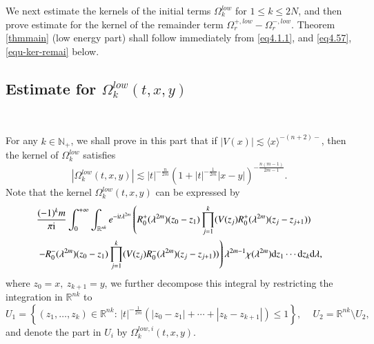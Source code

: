 \documentclass[11pt,reqno]{amsart}
\def\R {\mathbb{R}}
\def\d{{\rm d}}
\def\i{{\rm i}}
\def\k{{ \textbf{k}}}
\numberwithin{equation}{section}
\theoremstyle{definition}
\begin{document}

We next estimate the kernels of the initial terms $\Omega^{low}_{k}$ for $1\le k\le 2N$, and then prove estimate for the kernel of the remainder term $\Omega^{+, low}_{ r}-\Omega^{-, low}_{r}$. Theorem \ref{thmmain} (low energy part) shall follow immediately from \eqref{eq4.1.1}, and \eqref{eq4.57}, \eqref{equ-ker-remai} below.




\subsection{Estimate for $\Omega^{low}_{k}(t,x,y)$}\label{sec4.2.3}\

%
For any $k\in \mathbb{N}_+$, we shall prove in this part that if  $|V(x)|\lesssim\langle x\rangle^{-(n+2)-}$, then the kernel of $\Omega^{low}_{k}$ satisfies
\begin{equation}\label{eq4.57}
	\left|\Omega^{low}_{k}(t,x,y)\right| \lesssim |t|^{-\frac{n}{2m}}\left(1+|t|^{-\frac{1}{2m}}|x-y|\right)^{-\frac{n(m-1)}{2m-1}}.
\end{equation}
Note that the kernel $\Omega^{low}_{k}(t,x,y)$ can be expressed by
 \begin{align*}\label{eq4.58}
 	&\frac{(-1)^{k}m}{\pi \i}\int_{0}^{+\infty}\int_{\R^{nk}}e^{-\i t\lambda^{2m}}\left(R_{0}^{+}(\lambda^{2m})(z_{0}-z_{1})\prod_{j=1}^{k}(V(z_{j})R_{0}^{+}(\lambda^{2m})(z_{j}-z_{j+1}))\right.\nonumber\\	&\left.-R_{0}^{-}(\lambda^{2m})(z_{0}-z_{1})\prod_{j=1}^{k}(V(z_{j})R_{0}^{-}(\lambda^{2m})(z_{j}-z_{j+1}))\right)\lambda^{2m-1}\chi(\lambda^{2m})\d z_{1}\cdots \d z_{k}\d\lambda,
 \end{align*}
 where $z_{0}=x,\ z_{k+1}=y$, we further decompose this integral by restricting the integration in $\mathbb{R}^{nk}$ to
$$
U_1=\left\{(z_1,\ldots, z_k)\in \R^{nk}: \,|t|^{-\frac{1}{2m}}(|z_{0}-z_{1}|+\cdots+|z_{k}-z_{k+1}|)\leq1\right\},\,\quad U_2=\R^{nk}\setminus  U_2,
$$
and denote the part in $U_i$ by $\Omega^{low,i}_{k}(t,x,y)$.
\end{document}
